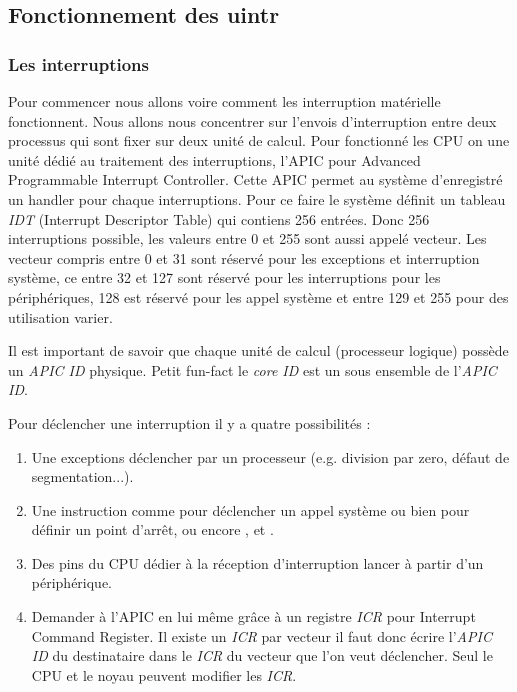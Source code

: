 \subsection{Fonctionnement des uintr}
\label{sec:uintr}

\subsubsection{Les interruptions}
\label{sec:interrupts}

Pour commencer nous allons voire comment les interruption matérielle fonctionnent.
Nous allons nous concentrer sur l'envois d'interruption entre deux processus qui sont fixer sur deux unité de calcul.
Pour fonctionné les CPU on une unité dédié au traitement des interruptions, l'APIC pour Advanced Programmable Interrupt Controller.
Cette APIC permet au système d'enregistré un handler pour chaque interruptions.
Pour ce faire le système définit un tableau \emph{IDT} (Interrupt Descriptor Table) qui contiens 256 entrées.
Donc 256 interruptions possible, les valeurs entre 0 et 255 sont aussi appelé vecteur.
Les vecteur compris entre 0 et 31 sont réservé pour les exceptions et interruption système, ce entre 32 et 127 sont réservé pour les interruptions pour les périphériques,
128 est réservé pour les appel système et entre 129 et 255 pour des utilisation varier.

Il est important de savoir que chaque unité de calcul (processeur logique) possède un \emph{APIC ID} physique.
Petit fun-fact le \emph{core ID} est un sous ensemble de l'\emph{APIC ID}.

Pour déclencher une interruption il y a quatre possibilités :

\begin{enumerate}
  \item Une exceptions déclencher par un processeur (e.g. division par zero, défaut de segmentation...).
  \item Une instruction comme  pour déclencher un appel système ou bien  pour définir un point d'arrêt, ou encore ,  et .
  \item Des pins du CPU dédier à la réception d'interruption lancer à partir d'un périphérique.
  \item Demander à l'APIC en lui même grâce à un registre \emph{ICR} pour Interrupt Command Register.
  Il existe un \emph{ICR} par vecteur il faut donc écrire l'\emph{APIC ID} du destinataire dans le \emph{ICR} du vecteur que l'on veut déclencher.
  Seul le CPU et le noyau peuvent modifier les \emph{ICR}.
\end{enumerate}

